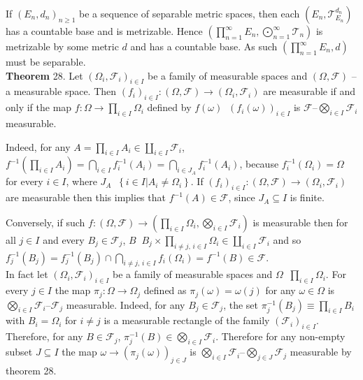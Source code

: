 \documentclass[a4paper]{article}
\newcommand{\obj}[1]{\left\{ #1 \right \}}
\newcommand{\brac}[1]{\left ( #1 \right )}
\newcommand{\induc}[1]{\left . #1 \right \vert}
\newcommand{\Tcal}{\mathcal{T}}
\newcommand{\Fcal}{\mathcal{F}}
\newcommand{\defn}{\mathop{\overset{\Delta}{=}}\nolimits}
\begin{document}
If $\brac{E_n, d_n}_{n\geq 1}$ be a sequence of separable metric spaces, then each $\brac{E_n, \Tcal_{E_n}^{d_n}}$ has a countable base and is metrizable. Hence $\brac{ \prod_{n=1}^\infty E_n, \bigodot_{n=1}^\infty \Tcal_n }$ is metrizable by some metric $d$ and has a countable base. As such $\brac{\prod_{n=1}^\infty E_n, d}$ must be separable.\\

\label{thm:meas_concat} \noindent \textbf{Theorem} 28.
Let $\brac{\Omega_i, \Fcal_i}_{i\in I}$ be a family of measurable spaces and $\brac{\Omega, \Fcal}$ -- a measurable space. Then $\brac{f_i}_{i\in I}:\brac{\Omega, \Fcal}\to\brac{\Omega_i, \Fcal_i}$ are measurable if and only if the map $f:\Omega\to \prod_{i\in I} \Omega_i$ defined by $f\brac{\omega}\defn \brac{f_i\brac{\omega}}_{i\in I}$ is $\Fcal$--$\bigotimes_{i\in I} \Fcal_i$ measurable.

Indeed, for any $A = \prod_{i\in I} A_i\in \coprod_{i\in I} \Fcal_i$, $f^{-1}\brac{\prod_{i\in I} A_i} = \bigcap_{i\in I} f^{-1}_i\brac{A_i} = \bigcap_{i\in J_A} f^{-1}_i\brac{A_i}$, because $f^{-1}_i\brac{\Omega_i} = \Omega$ for every $i\in I$, where $J_A\defn \obj{ \induc{i\in I} A_i\neq \Omega_i }$. If $\brac{f_i}_{i\in I}:\brac{\Omega, \Fcal}\to\brac{\Omega_i, \Fcal_i}$ are measurable then this implies that $f^{-1}\brac{A}\in \Fcal$, since $J_A\subseteq I$ is finite.

Conversely, if such $f:\brac{\Omega, \Fcal}\to \brac{\prod_{i\in I} \Omega_i, \bigotimes_{i\in I} \Fcal_i}$ is measurable then for all $j \in I$ and every $B_j\in \Fcal_j$, $B\defn B_j\times \prod_{i\neq j,\,i\in I} \Omega_i \in \coprod_{i\in I} \Fcal_i$ and so $f_j^{-1}\brac{B_j} = f_j^{-1}\brac{B_j} \cap \bigcap_{i\neq j,\,i\in I} f_i\brac{\Omega_i} = f^{-1}\brac{B} \in \Fcal$.\\

In fact let $\brac{\Omega_i, \Fcal_i}_{i\in I}$ be a family of measurable spaces and $\Omega\defn \prod_{i\in I}\Omega_i$. For every $j\in I$ the map $\pi_j:\Omega\to\Omega_j$ defined as $\pi_j\brac{\omega} = \omega\brac{j}$ for any $\omega\in \Omega$ is $\bigotimes_{i\in I} \Fcal_i$--$\Fcal_j$ measurable. Indeed, for any $B_j\in \Fcal_j$, the set $\pi_j^{-1}\brac{ B_j }\equiv \prod_{i\in I} B_i$ with $B_i=\Omega_i$ for $i\neq j$ is a measurable rectangle of the family $\brac{\Fcal_i}_{i\in I}$. Therefore, for any $B\in \Fcal_j$, $\pi_j^{-1}\brac{B}\in \bigotimes_{i\in I} \Fcal_i$. Therefore for any non-empty subset $J\subseteq I$ the map $\omega\to \brac{\pi_j\brac{\omega}}_{j\in J}$ is $\bigotimes_{i\in I} \Fcal_i$--$\bigotimes_{j\in J} \Fcal_j$ measurable by theorem 28.\\
\end{document}
